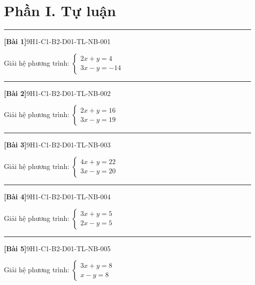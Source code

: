 \documentclass[12pt,a4paper]{article}
\newif\ifloigiai
\newenvironment{cauhoi}[2]{%
  \par\medskip\noindent\rule{\textwidth}{0.4pt}\par\nopagebreak
  \noindent\textbf{[#1]}\hfill{\scriptsize\ttfamily #2}\par\nopagebreak\smallskip}{\par}
\newcommand{\loigiai}[1]{\ifloigiai\par\smallskip\noindent\textit{Lời giải.} #1\par\fi}
\begin{document}
\section*{Phần I. Tự luận}
\begin{cauhoi}{Bài 1}{9H1-C1-B2-D01-TL-NB-001}
Giải hệ phương trình: $\begin{cases}2x + y=4\\ 3x - y=-14\end{cases}$
\loigiai{Cộng từng vế hai phương trình ta được $5x=-10$, suy ra $x=-2$. Thay vào phương trình thứ nhất: $2\cdot(-2)+y=4$, suy ra $y=8$. Vậy hệ có nghiệm $(x;y)=(-2;8)$.}
\end{cauhoi}
\begin{cauhoi}{Bài 2}{9H1-C1-B2-D01-TL-NB-002}
Giải hệ phương trình: $\begin{cases}2x + y=16\\ 3x - y=19\end{cases}$
\loigiai{Cộng từng vế hai phương trình ta được $5x=35$, suy ra $x=7$. Thay vào phương trình thứ nhất: $2\cdot(7)+y=16$, suy ra $y=2$. Vậy hệ có nghiệm $(x;y)=(7;2)$.}
\end{cauhoi}
\begin{cauhoi}{Bài 3}{9H1-C1-B2-D01-TL-NB-003}
Giải hệ phương trình: $\begin{cases}4x + y=22\\ 3x - y=20\end{cases}$
\loigiai{Cộng từng vế hai phương trình ta được $7x=42$, suy ra $x=6$. Thay vào phương trình thứ nhất: $4\cdot(6)+y=22$, suy ra $y=-2$. Vậy hệ có nghiệm $(x;y)=(6;-2)$.}
\end{cauhoi}
\begin{cauhoi}{Bài 4}{9H1-C1-B2-D01-TL-NB-004}
Giải hệ phương trình: $\begin{cases}3x + y=5\\ 2x - y=5\end{cases}$
\loigiai{Cộng từng vế hai phương trình ta được $5x=10$, suy ra $x=2$. Thay vào phương trình thứ nhất: $3\cdot(2)+y=5$, suy ra $y=-1$. Vậy hệ có nghiệm $(x;y)=(2;-1)$.}
\end{cauhoi}
\begin{cauhoi}{Bài 5}{9H1-C1-B2-D01-TL-NB-005}
Giải hệ phương trình: $\begin{cases}3x + y=8\\ x - y=8\end{cases}$
\loigiai{Cộng từng vế hai phương trình ta được $4x=16$, suy ra $x=4$. Thay vào phương trình thứ nhất: $3\cdot(4)+y=8$, suy ra $y=-4$. Vậy hệ có nghiệm $(x;y)=(4;-4)$.}
\end{cauhoi}
\end{document}
